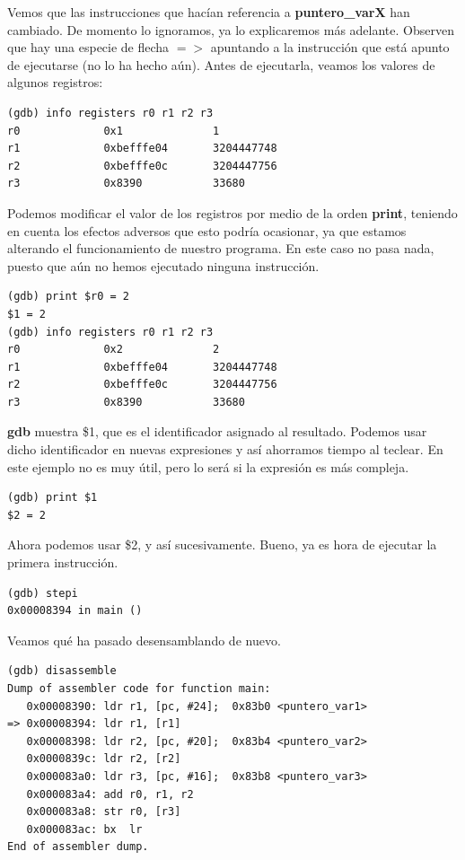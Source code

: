 Vemos que las instrucciones que hacían referencia a {\bf puntero\_varX}
han cambiado. De momento lo ignoramos, ya lo explicaremos más adelante.
Observen que hay una especie de flecha {\bf $=>$} apuntando a la
instrucción que está apunto de ejecutarse (no lo ha hecho aún).
Antes de ejecutarla, veamos los valores de algunos registros:

\begin{lstlisting}
(gdb) info registers r0 r1 r2 r3
r0             0x1              1
r1             0xbefffe04       3204447748
r2             0xbefffe0c       3204447756
r3             0x8390           33680
\end{lstlisting}

Podemos modificar el valor de los registros por medio de la orden
{\bf print}, teniendo en cuenta los efectos adversos que esto podría
ocasionar, ya que estamos alterando el funcionamiento de nuestro
programa. En este caso no pasa nada, puesto que aún no hemos ejecutado
ninguna instrucción.

\begin{lstlisting}
(gdb) print $r0 = 2
$1 = 2
(gdb) info registers r0 r1 r2 r3
r0             0x2              2
r1             0xbefffe04       3204447748
r2             0xbefffe0c       3204447756
r3             0x8390           33680
\end{lstlisting}

{\bf gdb} muestra \$1, que es el identificador asignado al resultado. Podemos
usar dicho identificador en nuevas expresiones y así ahorramos tiempo al teclear.
En este ejemplo no es muy útil, pero lo será si la expresión es más compleja.

\begin{lstlisting}
(gdb) print $1
$2 = 2
\end{lstlisting}

Ahora podemos usar \$2, y así sucesivamente. Bueno, ya es hora de ejecutar la primera
instrucción.

\begin{lstlisting}
(gdb) stepi
0x00008394 in main ()
\end{lstlisting}

Veamos qué ha pasado desensamblando de nuevo.

\begin{lstlisting}
(gdb) disassemble
Dump of assembler code for function main:
   0x00008390: ldr r1, [pc, #24];  0x83b0 <puntero_var1>
=> 0x00008394: ldr r1, [r1]
   0x00008398: ldr r2, [pc, #20];  0x83b4 <puntero_var2>
   0x0000839c: ldr r2, [r2]
   0x000083a0: ldr r3, [pc, #16];  0x83b8 <puntero_var3>
   0x000083a4: add r0, r1, r2
   0x000083a8: str r0, [r3]
   0x000083ac: bx  lr
End of assembler dump.
\end{lstlisting}

